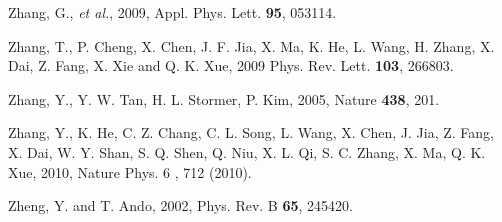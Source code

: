 \documentclass[twocolumn,floatfix,showpacs,rmp,aps]{revtex4}
\begin{document}
\begin{thebibliography}{99}
Zhang, G., \emph{et al.}, 2009,
Appl. Phys. Lett. {\bf 95}, 053114.

Zhang, T., P. Cheng, X. Chen, J. F. Jia, X. Ma, K. He, L. Wang, H. Zhang, X. Dai, Z. Fang,
X. Xie and Q. K. Xue, 2009
Phys. Rev. Lett. {\bf 103}, 266803.

Zhang, Y., Y. W. Tan, H. L. Stormer, P. Kim, 2005,
Nature {\bf 438}, 201.

Zhang, Y., K. He, C. Z. Chang, C. L. Song, L. Wang, X. Chen, J. Jia, Z. Fang, X. Dai, W. Y. Shan,
S. Q. Shen, Q. Niu, X. L. Qi, S. C. Zhang, X. Ma, Q. K. Xue, 2010,
Nature Phys. 6 , 712 (2010).

Zheng, Y. and T. Ando, 2002,
Phys. Rev. B {\bf 65}, 245420.



\end{thebibliography}
\end{document}
